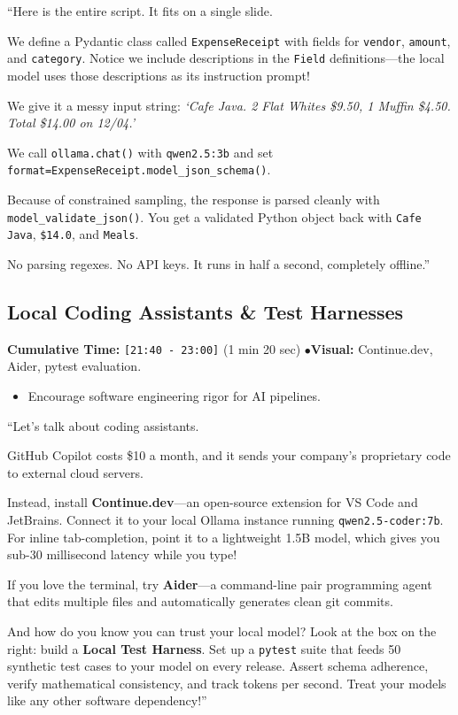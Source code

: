 \documentclass[11pt,a4paper]{article}
\begin{document}
\begin{speechbox}
``Here is the entire script. It fits on a single slide.

We define a Pydantic class called \texttt{ExpenseReceipt} with fields for \texttt{vendor}, \texttt{amount}, and \texttt{category}. Notice we include descriptions in the \texttt{Field} definitions---the local model uses those descriptions as its instruction prompt!

We give it a messy input string: \textit{`Cafe Java. 2 Flat Whites \$9.50, 1 Muffin \$4.50. Total \$14.00 on 12/04.'}

We call \texttt{ollama.chat()} with \texttt{qwen2.5:3b} and set \texttt{format=ExpenseReceipt.model\_json\_schema()}.

Because of constrained sampling, the response is parsed cleanly with \texttt{model\_validate\_json()}. You get a validated Python object back with \texttt{Cafe Java}, \texttt{\$14.0}, and \texttt{Meals}.

No parsing regexes. No API keys. It runs in half a second, completely offline.''
\end{speechbox}

\subsection{Local Coding Assistants \& Test Harnesses}
\begin{directionbox}
    \textbf{Cumulative Time:} \texttt{[21:40 - 23:00]} (1 min 20 sec) \quad$\bullet$\quad \textbf{Visual:} Continue.dev, Aider, pytest evaluation.
    \begin{itemize}
        \item Encourage software engineering rigor for AI pipelines.
    \end{itemize}
\end{directionbox}

\begin{speechbox}
``Let's talk about coding assistants.

GitHub Copilot costs \$10 a month, and it sends your company's proprietary code to external cloud servers.

Instead, install \textbf{Continue.dev}---an open-source extension for VS Code and JetBrains. Connect it to your local Ollama instance running \texttt{qwen2.5-coder:7b}. For inline tab-completion, point it to a lightweight 1.5B model, which gives you sub-30 millisecond latency while you type!

If you love the terminal, try \textbf{Aider}---a command-line pair programming agent that edits multiple files and automatically generates clean git commits.

And how do you know you can trust your local model?
Look at the box on the right: build a \textbf{Local Test Harness}. Set up a \texttt{pytest} suite that feeds 50 synthetic test cases to your model on every release. Assert schema adherence, verify mathematical consistency, and track tokens per second. Treat your models like any other software dependency!''
\end{speechbox}
\end{document}
